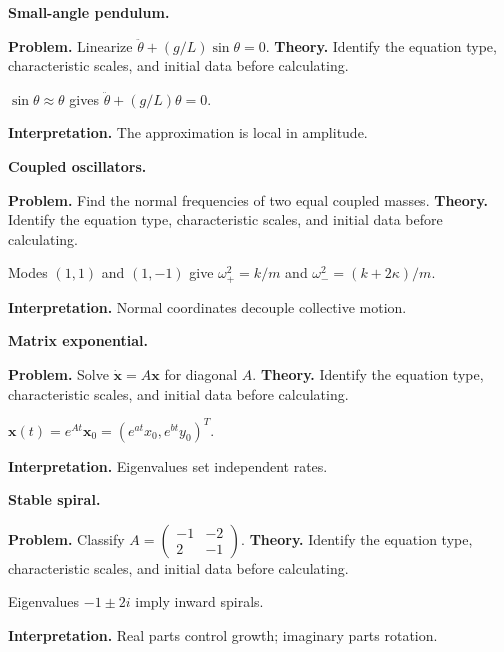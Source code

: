 \begin{workedexample}
\textbf{Small-angle pendulum.}\par
\textbf{Problem.} Linearize $\ddot\theta+(g/L)\sin\theta=0$.
\textbf{Theory.} Identify the equation type, characteristic scales, and initial data before calculating.
\begin{solution}
$\sin\theta\approx\theta$ gives $\ddot\theta+(g/L)\theta=0$.

\textbf{Interpretation.} The approximation is local in amplitude.
\end{solution}
\end{workedexample}

\begin{workedexample}
\textbf{Coupled oscillators.}\par
\textbf{Problem.} Find the normal frequencies of two equal coupled masses.
\textbf{Theory.} Identify the equation type, characteristic scales, and initial data before calculating.
\begin{solution}
Modes $(1,1)$ and $(1,-1)$ give $\omega_+^2=k/m$ and $\omega_-^2=(k+2\kappa)/m$.

\textbf{Interpretation.} Normal coordinates decouple collective motion.
\end{solution}
\end{workedexample}

\begin{workedexample}
\textbf{Matrix exponential.}\par
\textbf{Problem.} Solve $\dot{\mathbf x}=A\mathbf x$ for diagonal $A$.
\textbf{Theory.} Identify the equation type, characteristic scales, and initial data before calculating.
\begin{solution}
$\mathbf x(t)=e^{At}\mathbf x_0=(e^{at}x_0,e^{bt}y_0)^T$.

\textbf{Interpretation.} Eigenvalues set independent rates.
\end{solution}
\end{workedexample}

\begin{workedexample}
\textbf{Stable spiral.}\par
\textbf{Problem.} Classify $A=\begin{pmatrix}-1&-2\\2&-1\end{pmatrix}$.
\textbf{Theory.} Identify the equation type, characteristic scales, and initial data before calculating.
\begin{solution}
Eigenvalues $-1\pm2i$ imply inward spirals.

\textbf{Interpretation.} Real parts control growth; imaginary parts rotation.
\end{solution}
\end{workedexample}

